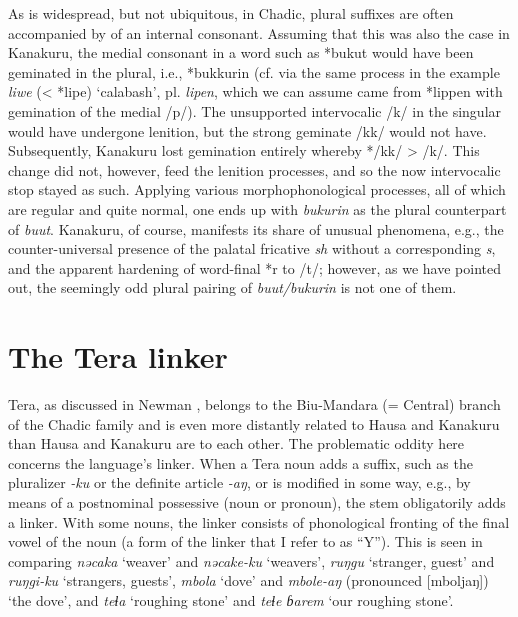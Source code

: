 \documentclass[output=paper,colorlinks,citecolor=brown]{langscibook}
\begin{document}
As is widespread, but not ubiquitous, in Chadic, plural suffixes are often accompanied by  of an internal consonant. Assuming that this was also the case in Kanakuru, the medial consonant in a word such as *bukut would have been geminated in the plural, i.e., *bukkurin (cf. via the same process in the example \textit{liwe} (< *lipe) `calabash’, pl. \textit{lipen}, which we can assume came from *lippen with gemination of the medial /p/). The unsupported intervocalic /k/ in the singular would have undergone lenition, but the strong geminate /kk/ would not have. Subsequently, Kanakuru lost gemination entirely whereby */kk/ > /k/. This change did not, however, feed the lenition processes, and so the now intervocalic stop stayed as such. Applying various morphophonological processes, all of which are regular and quite normal, one ends up with \textit{bukurin} as the plural counterpart of \textit{buut}. Kanakuru, of course, manifests its share of unusual phenomena, e.g., the counter-universal presence of the palatal fricative \textit{sh} without a corresponding \textit{s}, and the apparent hardening of word-final *r to /t/; however, as we have pointed out, the seemingly odd plural pairing of \textit{buut/bukurin} is not one of them.

\section{The Tera linker}

Tera, as discussed in Newman \citeyearpar{Newman1964}, belongs to the Biu-Mandara (= Central) branch of the Chadic family and is even more distantly related to Hausa and Kanakuru than Hausa and Kanakuru are to each other. The problematic oddity here concerns the language's linker. When a Tera noun adds a suffix, such as the pluralizer \textit{-ku} or the definite article \textit{-aŋ}, or is modified in some way, e.g., by means of a postnominal possessive (noun or pronoun), the stem obligatorily adds a linker. With some nouns, the linker consists of phonological fronting of the final vowel of the noun (a form of the linker that I refer to as “Y”). This is seen in comparing \textit{nǝcaka} `weaver’ and \textit{nǝcake-ku} `weavers', \textit{ruŋgu} `stranger, guest’ and \textit{ruŋgi-ku} `strangers, guests', \textit{mbola} ‘dove’ and \textit{mbole-aŋ} (pronounced [mboljaŋ]) ‘the dove’, and \textit{teɬa} `roughing stone’ and \textit{teɬe ɓarem} ‘our roughing stone’. 
\end{document}
